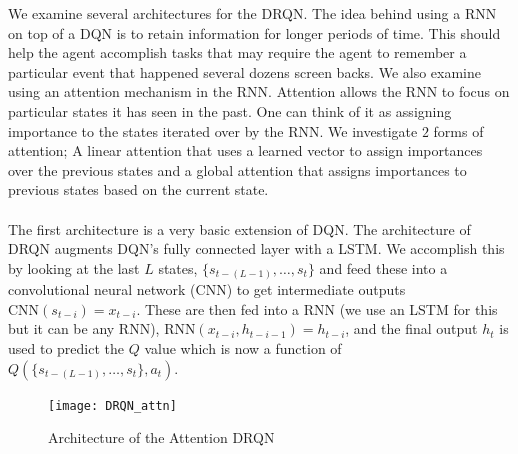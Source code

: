 \documentclass{article}
\begin{document}
We examine several architectures for the DRQN. The idea behind using a RNN on top
of a DQN is to retain information for longer periods of time. This should help the
agent accomplish tasks that may require the agent to remember a particular event
that happened several dozens screen backs. We also examine using an attention
mechanism in the RNN. Attention allows the RNN to focus on particular states it
has seen in the past. One can think of it as assigning importance to the states
iterated over by the RNN. We investigate $2$ forms of attention; A linear attention
that uses a learned vector to assign importances over the previous states and a
global attention that assigns importances to previous states based on the current
state. \\
\\
The first architecture is a very basic extension of DQN. The architecture of DRQN
augments DQN's fully connected layer with a LSTM. We accomplish this by looking at
the last $L$ states, $\{s_{t-(L-1)}, \dots, s_{t}\}$ and feed these into a
convolutional neural network (CNN) to get intermediate outputs
$\text{CNN}(s_{t-i}) = x_{t-i}$. These are then fed into a RNN (we use an LSTM for
this but it can be any RNN), $\text{RNN}(x_{t-i}, h_{t-i-1}) = h_{t-i}$, and the
final output $h_t$ is used to predict the $Q$ value which is now a function of
$Q(\{s_{t-(L-1)}, \dots, s_t\}, a_t)$.

\begin{figure}[h]
    \centering
    \texttt{[image: DRQN\_attn]}
    \caption{Architecture of the Attention DRQN}
\end{figure}
\end{document}
